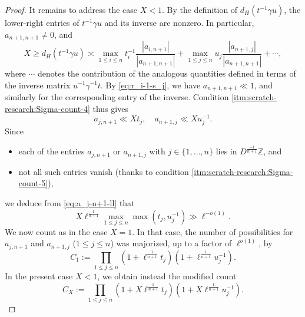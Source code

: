 \documentclass[reqno]{amsart}
\theoremstyle{plain} \newtheorem{theorem} {Theorem}
\theoremstyle{definition} \newtheorem{definition} [theorem] {Definition}
\theoremstyle{itplain} %
\numberwithin{equation}{section}
\numberwithin{theorem}{section}
\renewcommand{\geq}{\geqslant}
\renewcommand{\leq}{\leqslant}
\begin{document}
\begin{proof}
  It remains to address the case $X < 1$.  By the definition of $d_H(t^{-1} \gamma u)$, the lower-right entries of $t^{-1} \gamma u$ and its inverse are nonzero.  In particular, $a_{n+1,n+1} \neq 0$, and
    \begin{equation}\label{eq:d_hr-1-gamma}
      X \geq d_H(t^{-1} \gamma u) \asymp 
      \max_{1 \leq i \leq n}
      t_i^{-1} \frac{|a_{i,n+1}|}{ | a_{n+1, n+1}|}
      + 
      \max_{1 \leq j \leq n}
      u_j \frac{|a_{n+1, j}|}{ | a_{n+1, n+1}|}
      + \dotsb,
  \end{equation}
  where $\dotsb$ denotes the contribution of the analogous quantities defined in terms of the inverse matrix $u^{-1} \gamma^{-1} t$.  By \eqref{eq:r_i-1-s_j}, we have $a_{n+1,n+1} \ll 1$, and similarly for the corresponding entry of the inverse.  Condition \eqref{itm:scratch-research:Sigma-count-4} thus gives
  \begin{equation}\label{eq:a_j-n+1-ll}
    a_{j,n+1} \ll X t_j, \quad
    a_{n+1,j} \ll X u_j^{-1}.
  \end{equation}
  Since
  \begin{itemize}
  \item each of the entries $a_{j,n+1}$ or $a_{n+1,j}$ with $j \in \{1,\dotsc,n\}$ lies in $D ^{\frac{-1}{n+1}} \mathbb{Z}$, and
  \item not all such entries vanish (thanks to condition \eqref{itm:scratch-research:Sigma-count-5}),
  \end{itemize}
  we deduce from \eqref{eq:a_j-n+1-ll} that
  \begin{equation}\label{eq:x-max_1-leq}
    X \ell^{\frac{1}{n+1}} \max_{1 \leq j \leq n} \max(t_j, u_j^{-1}) \gg \ell ^{ - o(1)}.
  \end{equation}
  We now count as in the case $X = 1$.  In that case, the number of possibilities for $a_{j,n+1}$ and $a_{n+1,j}$ ($1 \leq j \leq n$) was majorized, up to a factor of $\ell^{o(1)}$, by
  \begin{equation*}
    C_1 := \prod_{1 \leq j \leq n } (1 + \ell^{\frac{1}{n+1}} t_j)  (1 + \ell^{\frac{1}{n+1}} u_j^{-1}).
  \end{equation*}
  In the present case $X < 1$, we obtain instead the modified count
  \begin{equation}\label{eq:c_x-:=-prod_1}
    C_X := \prod_{1 \leq j \leq n } (1 + X \ell^{\frac{1}{n+1}} t_j)  (1 + X \ell^{\frac{1}{n+1}} u_j^{-1}).
  \end{equation}


\end{proof}
\end{document}
